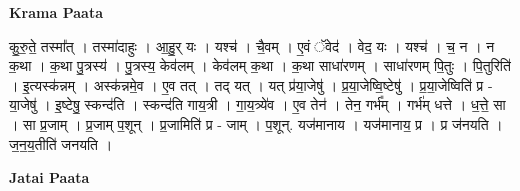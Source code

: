 \documentclass[17pt]{extarticle}
\begin{document}
\textbf{Krama Paata} \newline

कु॒रु॒ते॒ तस्मा᳚त् । तस्मा॑दाहुः । आ॒हु॒र् यः । यश्च॑ । चै॒वम् । ए॒वं ॅवेद॑ । वेद॒ यः । यश्च॑ । च॒ न । न क॒था । क॒था पु॒त्रस्य॑ । पु॒त्रस्य॒ केव॑लम् । केव॑लम् क॒था । क॒था साधा॑रणम् । साधा॑रणम् पि॒तुः । पि॒तुरिति॑ । इ॒त्यस्क॑न्नम् । अस्क॑न्नमे॒व । ए॒व तत् । तद् यत् । यत् प्र॑या॒जेषु॑ । प्र॒या॒जेष्वि॒ष्टेषु॑ । प्र॒या॒जेष्विति॑ प्र - या॒जेषु॑ । इ॒ष्टेषु॒ स्कन्द॑ति । स्कन्द॑ति गाय॒त्री । गा॒य॒त्र्ये॑व । ए॒व तेन॑ । तेन॒ गर्भ᳚म् । गर्भ॑म् धत्ते । ध॒त्ते॒ सा । सा प्र॒जाम् । प्र॒जाम् प॒शून् । प्र॒जामिति॑ प्र - जाम् । प॒शून्. यज॑मानाय । यज॑मानाय॒ प्र । प्र ज॑नयति । ज॒न॒य॒तीति॑ जनयति । \newline

\textbf{Jatai Paata} \newline
\end{document}
